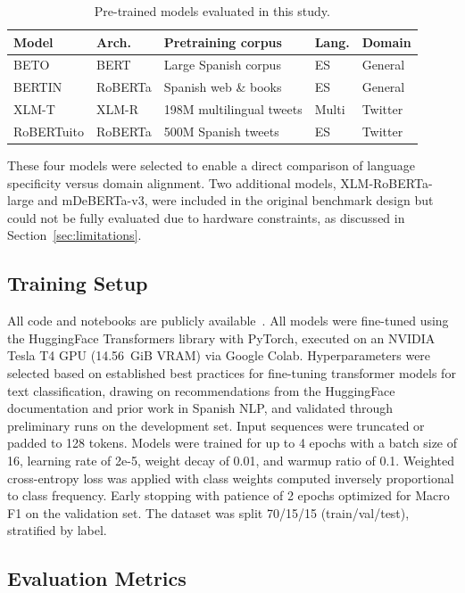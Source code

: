 \documentclass[runningheads]{llncs}
\begin{document}
\begin{table}[h]
\caption{Pre-trained models evaluated in this study.}
\label{tab:models}
\centering
\begin{tabular}{lllll}
\toprule
\textbf{Model} & \textbf{Arch.} & \textbf{Pretraining corpus} & \textbf{Lang.} & \textbf{Domain} \\
\midrule
BETO & BERT & Large Spanish corpus & ES & General \\
BERTIN & RoBERTa & Spanish web \& books & ES & General \\
XLM-T & XLM-R & 198M multilingual tweets & Multi & Twitter \\
RoBERTuito & RoBERTa & 500M Spanish tweets & ES & Twitter \\
\bottomrule
\end{tabular}
\end{table}

These four models were selected to enable a direct comparison of language specificity
versus domain alignment. Two additional models, XLM-RoBERTa-large and
mDeBERTa-v3, were included in the original benchmark design but could not be fully
evaluated due to hardware constraints, as discussed in Section~\ref{sec:limitations}.

\subsection{Training Setup}
\label{sec:training}

All code and notebooks are publicly available~\cite{thomas2026}. All models were fine-tuned using the HuggingFace Transformers library with PyTorch,
executed on an NVIDIA Tesla T4 GPU (14.56~GiB VRAM) via Google Colab.
Hyperparameters were selected based on established best practices for fine-tuning
transformer models for text classification, drawing on recommendations from the
HuggingFace documentation and prior work in Spanish NLP, and validated through
preliminary runs on the development set. Input sequences were truncated or padded to
128 tokens. Models were trained for up to 4 epochs with a batch size of 16, learning
rate of 2e-5, weight decay of 0.01, and warmup ratio of 0.1. Weighted cross-entropy
loss was applied with class weights computed inversely proportional to class frequency.
Early stopping with patience of 2 epochs optimized for Macro F1 on the validation set.
The dataset was split 70/15/15 (train/val/test), stratified by label.

\subsection{Evaluation Metrics}
\end{document}
